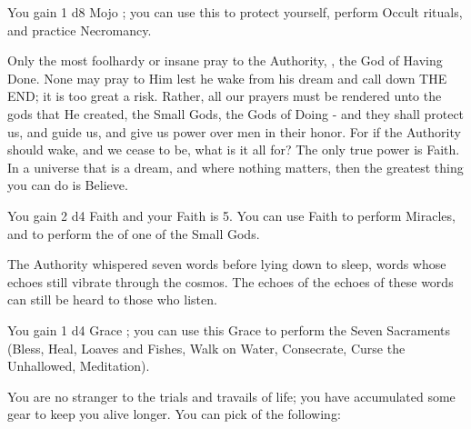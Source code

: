 {    You gain 1 d8 Mojo \UD; you can use this \UD to protect yourself, perform Occult rituals, and practice Necromancy.\footnotemark

  
    Only the most foolhardy or insane pray to the Authority, \TheAuthority, the God of Having Done.  None may pray to Him lest he wake from his dream and call down THE END; it is too great a risk. Rather, all our prayers must be rendered unto  the gods that He created, the Small Gods, the Gods of Doing - and they shall protect us, and guide us, and give us power over men in their honor.  For if the Authority should wake, and we cease to be, what is it all for?  The only true power is Faith.  In a universe that is a dream, and where nothing matters, then the greatest thing you can do is Believe.

    You gain 2 d4 Faith \POOL and your \MAX Faith is 5. You can use Faith to perform Miracles, and to perform the  of one of the Small Gods.\footnotemark[\value{footnote}]



    The Authority whispered seven words before lying down to sleep, words whose echoes still vibrate through the cosmos.  The echoes of the echoes of these words can still be heard to those who listen.  

    You gain 1 d4 Grace \UD; you can use this Grace to perform the Seven Sacraments (Bless, Heal, Loaves and Fishes, Walk on Water, Consecrate, Curse the Unhallowed, Meditation).\footnotemark[\value{footnote}]



    You are no stranger to the trials and travails of life; you have accumulated some gear to keep you alive longer.  You can pick  of the following:



}
